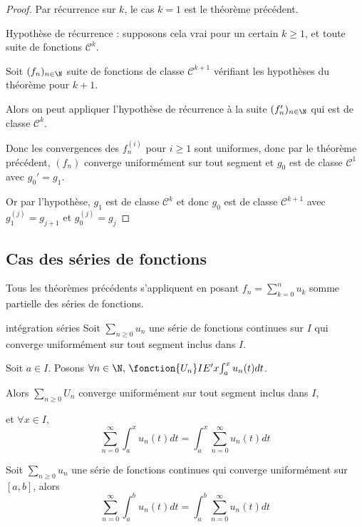 
\begin{proof}
    Par récurrence sur $k$, le cas $k = 1$ est le théorème précédent.

    Hypothèse de récurrence : supposons cela vrai pour un certain $k \geqslant 1$, et toute 
    suite de fonctions $\mathscr C^k$. 

    Soit $(f_n)_{n \in \N}$ suite de fonctions de classe $\mathscr{C}^{k + 1}$ vérifiant les hypothèses du théorème pour $k + 1$.

    Alors on peut appliquer l'hypothèse de récurrence à la suite $(f_n')_{n \in \N}$ qui est de classe $\mathscr{C}^k$.

    Donc les convergences des $f_n^{(i)}$ pour $i \geqslant 1$ sont uniformes, donc 
    par le théorème précédent, $(f_n)$ converge uniformément sur tout segment et 
    $g_0$ est de classe $\mathscr{C}^1$ avec $g_0' = g_1$. 

    Or par l'hypothèse, $g_1$ est de classe $\mathscr{C}^k$ et donc $g_0$ est de classe $\mathscr{C}^{k + 1}$ avec
    $g_1^{(j)} = g_{j + 1}$ et $g_0^{(j)} = g_j$ 
\end{proof}

\subsection{Cas des séries de fonctions }

Tous les théorèmes précédents s'appliquent en posant $\displaystyle f_n = \sum_{k = 0}^n u_k$ somme partielle des 
séries de fonctions.

\begin{theoreme}{intégration séries}{}
    Soit $\sum_{n \geqslant 0} u_n$ une série de fonctions continues sur $I$ qui converge uniformément 
    sur tout segment inclus dans $I$.

    Soit $a \in I$. Posons $\forall n \in \N, \, \fonction{U_n} I {E'}{x}{\int_a^x u_n(t) dt}$.

    Alors $\sum_{n \geqslant 0} U_n$ converge uniformément sur tout segment inclus dans $I$, 
    
    et 
    $\forall x \in I$, 
    $$\sum_{n = 0 }^{ \infty } \int_{a }^{x } u_n(t) dt = \int_{a}^{x } \sum_{n = 0}^{\infty} u_n(t) dt$$
\end{theoreme}

\begin{corollaire}{}{}
    Soit $\sum_{n \geqslant 0} u_n$ une série de fonctions continues qui converge uniformément sur 
    $[a, b]$, alors 
    $$\sum_{n = 0}^{\infty} \int_{a}^{b} u_n(t) dt = \int_{a}^{b} \sum_{n = 0}^{\infty} u_n(t) dt$$
\end{corollaire}

